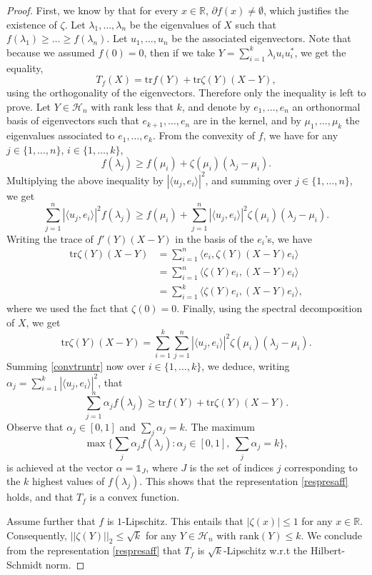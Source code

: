 \documentclass[aop,preprint]{imsart}
\newcommand\RR{\mathbb{R}}
\newcommand\tr{\mathrm{tr}}
\newcommand\Car{\mathds{1}}
\newcommand\rk{\mathrm{rank}}
\numberwithin{equation}{section}
\theoremstyle{definition}
\theoremstyle{plain}
\theoremstyle{remark}
\begin{document}
\begin{proof}
 First, we know by \cite[Theorem 23.4]{Rockafeller} that for every $x \in \RR$, $\partial f (x) \neq \emptyset$, which justifies the existence of $\zeta$.
Let $\lambda_1,\ldots,\lambda_n$ be the eigenvalues of $X$ such that $f(\lambda_1)\geq \ldots \geq  f(\lambda_n)$. Let $u_1,\ldots,u_n$ be the associated eigenvectors. Note that because we assumed $f(0)=0$, then if we take $Y = \sum_{i=1}^k \lambda_i u_i u_i^*$, we get the equality,
$$ T_f(X) = \tr f(Y) + \tr \zeta(Y)(X-Y),$$
 using the orthogonality of the eigenvectors. Therefore only the inequality is left to prove. Let $Y \in\mathcal{H}_n$ with rank less that $k$, and denote by $e_1,\ldots,e_n$ an orthonormal basis of eigenvectors such that $e_{k+1},\ldots,e_n$ are in the kernel, and by $\mu_1,\ldots,\mu_k$ the eigenvalues associated to $e_1,\ldots,e_k$. 
From the convexity of $f$, we have for any $j \in \{1,\ldots,n\}$, $i \in \{1,\ldots,k\}$, 
$$f(\lambda_j) \geq f(\mu_i) + \zeta(\mu_i)(\lambda_j-\mu_i).$$
Multiplying the above inequality by $|\langle u_j, e_i \rangle|^2$, and summing over $j \in\{1,\ldots,n\}$, we get
\begin{equation}\label{convtruntr} \sum_{j=1}^n | \langle u_j, e_i \rangle|^2 f(\lambda_j) \geq f(\mu_i) + \sum_{j=1}^n |\langle u_j, e_i \rangle|^2 \zeta(\mu_i) (\lambda_j -\mu_i).\end{equation}
Writing the trace of $f'(Y)(X-Y)$ in the basis of the $e_i$'s, we have
\begin{align*}
 \tr \zeta(Y)(X-Y)& = \sum_{i=1}^n \langle e_i,  \zeta(Y)(X-Y) e_i\rangle \\
&= \sum_{i=1}^n \langle \zeta(Y)e_i,  (X-Y) e_i\rangle\\
& = \sum_{i=1}^k \langle \zeta(Y)e_i,  (X-Y) e_i\rangle,
\end{align*}
where we used the fact that $\zeta(0)=0$. Finally, using the spectral decomposition of $X$, we get
$$  \tr \zeta(Y)(X-Y) = \sum_{i=1}^k \sum_{j=1}^n |\langle u_j, e_i \rangle|^2 \zeta(\mu_i) (\lambda_j -\mu_i).$$
Summing \eqref{convtruntr} now over $i\in\{1,\ldots,k\}$, we deduce, writing $\alpha_j = \sum_{i=1}^k |\langle u_j, e_i\rangle|^2$, that
$$\sum_{j=1}^n \alpha_j f(\lambda_j) \geq \tr f(Y) +  \tr \zeta(Y)(X-Y) .$$
Observe that $\alpha_j \in [0,1]$ and $\sum_j \alpha_j =k$. The maximum 
$$ \max \{ \sum_j \alpha_j f(\lambda_j) : \alpha_j \in [0,1],  \ \sum_j \alpha_j =k\},$$
is achieved at the vector $\alpha = \Car_{J}$, where $J$ is the set of indices $j$ corresponding to the $k$ highest values of $f(\lambda_j)$. 
This shows that the representation \eqref{respresaff} holds, and that $T_f$ is a convex function.

Assume further that $f$ is $1$-Lipschitz. This entails that $|\zeta(x)|\leq 1$ for any $x\in\RR$. Consequently, $||\zeta(Y)||_2 \leq \sqrt{k}$ for any $Y\in\mathcal{H}_n$ with $\rk(Y) \leq k$. We conclude from the representation \eqref{respresaff} that $T_f$ is $\sqrt{k}$-Lipschitz w.r.t the Hilbert-Schmidt norm.
\end{proof}
\end{document}
